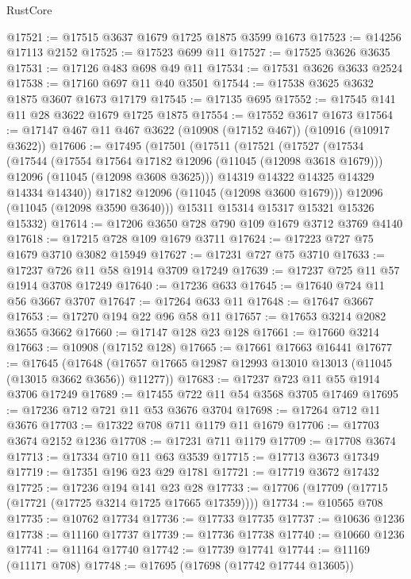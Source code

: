 \begin{lexlean}{RustCore}
\begin{coremodule}
@17521 := @17515 @3637 @1679 @1725 @1875 @3599 @1673
@17523 := @14256 @17113 @2152
@17525 := @17523 @699 @11
@17527 := @17525 @3626 @3635
@17531 := @17126 @483 @698 @49 @11
@17534 := @17531 @3626 @3633 @2524
@17538 := @17160 @697 @11 @40 @3501
@17544 := @17538 @3625 @3632 @1875 @3607 @1673 @17179
@17545 := @17135 @695
@17552 := @17545 @141 @11 @28 @3622 @1679 @1725 @1875
@17554 := @17552 @3617 @1673
@17564 := @17147 @467 @11 @467 @3622 (@10908 (@17152 @467)) (@10916 (@10917 @3622))
@17606 := @17495
    (@17501
      (@17511
        (@17521
          (@17527
            (@17534
              (@17544
                (@17554 @17564 @17182 @12096 (@11045 (@12098 @3618 @1679)))
                @12096
                (@11045 (@12098 @3608 @3625)))
              @14319
              @14322
              @14325
              @14329
              @14334
              @14340))
          @17182
          @12096
          (@11045 (@12098 @3600 @1679)))
        @12096
        (@11045 (@12098 @3590 @3640)))
      @15311
      @15314
      @15317
      @15321
      @15326
      @15332)
@17614 := @17206 @3650 @728 @790 @109 @1679 @3712 @3769 @4140
@17618 := @17215 @728 @109 @1679 @3711
@17624 := @17223 @727 @75 @1679 @3710 @3082 @15949
@17627 := @17231 @727 @75 @3710
@17633 := @17237 @726 @11 @58 @1914 @3709 @17249
@17639 := @17237 @725 @11 @57 @1914 @3708 @17249
@17640 := @17236 @633
@17645 := @17640 @724 @11 @56 @3667 @3707
@17647 := @17264 @633 @11
@17648 := @17647 @3667
@17653 := @17270 @194 @22 @96 @58 @11
@17657 := @17653 @3214 @2082 @3655 @3662
@17660 := @17147 @128 @23 @128
@17661 := @17660 @3214
@17663 := @10908 (@17152 @128)
@17665 := @17661 @17663 @16441
@17677 := @17645
    (@17648 (@17657 @17665 @12987 @12993 @13010 @13013 (@11045 (@13015 @3662 @3656)) @11277))
@17683 := @17237 @723 @11 @55 @1914 @3706 @17249
@17689 := @17455 @722 @11 @54 @3568 @3705 @17469
@17695 := @17236 @712 @721 @11 @53 @3676 @3704
@17698 := @17264 @712 @11 @3676
@17703 := @17322 @708 @711 @1179 @11 @1679
@17706 := @17703 @3674 @2152 @1236
@17708 := @17231 @711 @1179
@17709 := @17708 @3674
@17713 := @17334 @710 @11 @63 @3539
@17715 := @17713 @3673 @17349
@17719 := @17351 @196 @23 @29 @1781
@17721 := @17719 @3672 @17432
@17725 := @17236 @194 @141 @23 @28
@17733 := @17706 (@17709 (@17715 (@17721 (@17725 @3214 @1725 @17665 @17359))))
@17734 := @10565 @708
@17735 := @10762 @17734
@17736 := @17733 @17735
@17737 := @10636 @1236
@17738 := @11160 @17737
@17739 := @17736 @17738
@17740 := @10660 @1236
@17741 := @11164 @17740
@17742 := @17739 @17741
@17744 := @11169 (@11171 @708)
@17748 := @17695 (@17698 (@17742 @17744 @13605))

\end{coremodule}
\end{lexlean}
